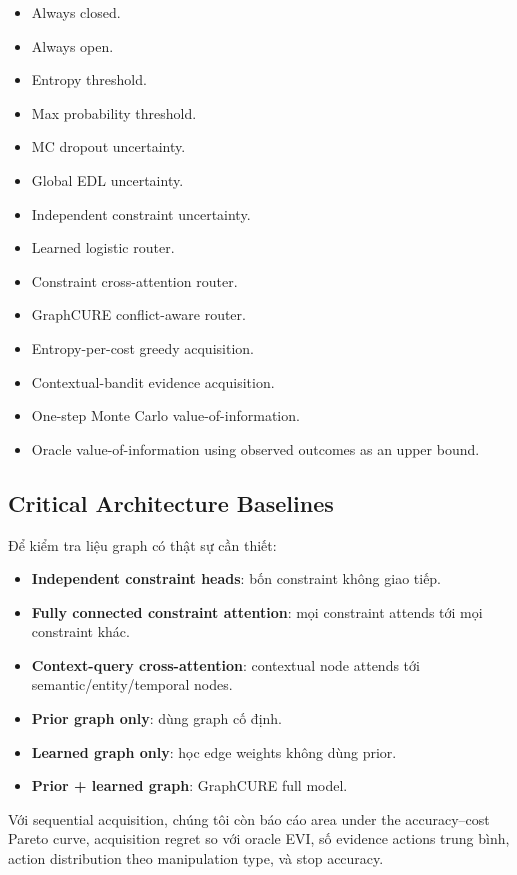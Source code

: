 \documentclass[11pt,a4paper]{article}
\begin{document}
\begin{itemize}[leftmargin=1.5em]
\item Always closed.
\item Always open.
\item Entropy threshold.
\item Max probability threshold.
\item MC dropout uncertainty.
\item Global EDL uncertainty.
\item Independent constraint uncertainty.
\item Learned logistic router.
\item Constraint cross-attention router.
\item GraphCURE conflict-aware router.
\item Entropy-per-cost greedy acquisition.
\item Contextual-bandit evidence acquisition.
\item One-step Monte Carlo value-of-information.
\item Oracle value-of-information using observed outcomes as an upper bound.
\end{itemize}

\subsection{Critical Architecture Baselines}

Để kiểm tra liệu graph có thật sự cần thiết:

\begin{itemize}[leftmargin=1.5em]
\item \textbf{Independent constraint heads}: bốn constraint không giao tiếp.
\item \textbf{Fully connected constraint attention}: mọi constraint attends tới mọi constraint khác.
\item \textbf{Context-query cross-attention}: contextual node attends tới semantic/entity/temporal nodes.
\item \textbf{Prior graph only}: dùng graph cố định.
\item \textbf{Learned graph only}: học edge weights không dùng prior.
\item \textbf{Prior + learned graph}: GraphCURE full model.
\end{itemize}

\noindent Với sequential acquisition, chúng tôi còn báo cáo area under the accuracy--cost Pareto curve, acquisition regret so với oracle EVI, số evidence actions trung bình, action distribution theo manipulation type, và stop accuracy.
\end{document}
